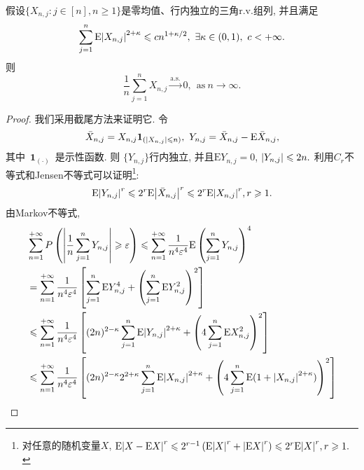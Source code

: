 \documentclass[12pt]{article}
\begin{document}
	\begin{Lemma}
    	 假设$\{ X_{n,j}:j\in[n],n\geqslant 1 \}$是零均值、行内独立的三角$\mathrm{r.v.}$组列, 并且满足
    	 \begin{equation}
    	     \sum_{j=1}^n\mathrm{E} \abs{X_{n,j}}^{2+\kappa}\leqslant cn^{1+\kappa/2},~\exists\kappa\in(0,1),~c<+\infty.
    	 \end{equation}
    	 则\begin{equation}
    	     \frac{1}{n}\sum_{j=1}^nX_{n,j} \xrightarrow{\text{a.s.}} 0,~~\text{as}~n\to\infty.
    	 \end{equation}
	\end{Lemma}
	\begin{proof}
	    我们采用截尾方法来证明它. 令
	    \begin{equation}
	        \Bar{X}_{n,j} = X_{n,j}\bm{1}_{(\abs{X_{n,j}}\leqslant n)},~Y_{n,j} = \Bar{X}_{n,j} - \mathrm{E}\Bar{X}_{n,j},
	    \end{equation}
	    其中~$\bm{1}_{(\cdot)}$~是示性函数. 则
	    $\{Y_{n,j}\}$行内独立, 并且$\mathrm{E}Y_{n,j} = 0$, $\abs{Y_{n,j}}\leqslant 2n.$
	    利用$C_r$不等式和Jensen不等式可以证明\footnote{
	        对任意的随机变量$X$, $\mathrm{E}\abs{X - \mathrm{E}X}^r \leqslant 2^{r-1}\left(\mathrm{E}\abs{X}^r+\abs{\mathrm{E}X}^r\right) \leqslant 2^r\mathrm{E}\abs{X}^r, r\geqslant 1.$
	    }:
	    \begin{equation*}
	        \mathrm{E}\abs{Y_{n,j}}^{r} \leqslant 2^{r}\mathrm{E}\abs{\Bar{X}_{n,j}}^{r}\leqslant 2^{r}\mathrm{E}\abs{X_{n,j}}^{r}, r \geqslant 1.
	    \end{equation*}
	    由Markov不等式, \begin{align*}
	        &\sum_{n = 1}^{+\infty}P\left( \abs{\frac{1}{n}\sum_{j = 1}^nY_{n,j}}\geqslant \varepsilon \right) \leqslant \sum_{n = 1}^{+\infty}\frac{1}{n^4\varepsilon^4}\mathrm{E}\left({\sum_{j = 1}^nY_{n,j}}\right)^4\\
	        &=\sum_{n = 1}^{+\infty}\frac{1}{n^4\varepsilon^4}\left[\sum_{j=1}^n\mathrm{E}Y_{n,j}^4 + \left( \sum_{j=1}^n\mathrm{E}Y_{n,j}^2 \right)^2 \right]\\
	        &\leqslant \sum_{n = 1}^{+\infty} \frac{1}{n^4\varepsilon^4}\left[(2n)^{2-\kappa}\sum_{j=1}^n\mathrm{E}\abs{Y_{n,j}}^{2+\kappa}+\left(4 \sum_{j=1}^n\mathrm{E}X_{n,j}^2 \right)^2 \right]\\
	        &\leqslant \sum_{n = 1}^{+\infty} \frac{1}{n^4\varepsilon^4}\left[(2n)^{2-\kappa}2^{2+\kappa}\sum_{j=1}^n\mathrm{E}\abs{X_{n,j}}^{2+\kappa}+\left( 4\sum_{j=1}^n\mathrm{E}(1+\abs{X_{n,j}}^{2+\kappa}) \right)^2 \right]\\

\end{align*}
\end{proof}
\end{document}
